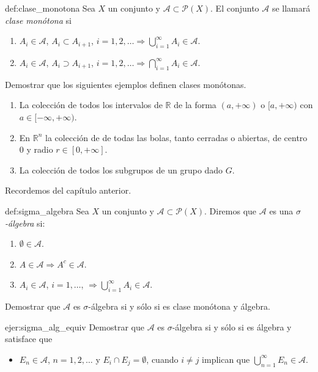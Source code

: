 \begin{definicion}{def:clase_monotona} 
 Sea $X$ un conjunto y $\mathscr{A}\subset\mathcal{P}(X)$. El conjunto $\mathscr{A}$ se llamará   \emph{clase monótona} si
 \begin{enumerate}
  \item $A_i\in\mathscr{A}$, $A_i\subset A_{i+1}$, $i=1,2,\ldots\Rightarrow \bigcup_{i=1}^{\infty}A_i\in\mathscr{A}$. 
    \item $A_i\in\mathscr{A}$, $A_i\supset A_{i+1}$, $i=1,2,\ldots\Rightarrow \bigcap_{i=1}^{\infty}A_i\in\mathscr{A}$. 
 \end{enumerate}

\end{definicion}

\begin{ejercicio}{} Demostrar que los siguientes ejemplos definen clases monótonas.
 \begin{enumerate}
  \item La colección de todos los intervalos de $\mathbb{R}$ de la forma $(a,+\infty)$ o $[a,+\infty)$ con $a\in [-\infty,+\infty)$.
  \item En $\mathbb{R}^n$ la colección de de todas las bolas, tanto cerradas o abiertas, de centro $0$ y radio $r\in[0,+\infty]$. 
  \item La colección de todos los subgrupos de un grupo dado $G$. 
 \end{enumerate}
\end{ejercicio}

Recordemos del capítulo anterior.
\begin{definicion}{def:sigma_algebra} 
 Sea $X$ un conjunto y $\mathscr{A}\subset \mathcal{P}(X)$. Diremos que $\mathscr{A}$ es una \emph{$\sigma$-álgebra} si:
 \begin{enumerate}
  \item $\emptyset\in\mathscr{A}$.
  \item $A\in\mathscr{A}\Rightarrow A^c\in\mathscr{A}$.
  \item $A_i\in\mathscr{A}$, $i=1,\ldots$, $\Rightarrow\bigcup_{i=1}^{\infty}A_i\in\mathscr{A}$.
 \end{enumerate}

\end{definicion}


\begin{ejercicio}{} Demostrar que  $\mathscr{A}$ es $\sigma$-álgebra si y sólo si es clase monótona y álgebra.
 
\end{ejercicio}
\begin{ejercicio}{ejer:sigma_alg_equiv} Demostrar que  $\mathscr{A}$ es $\sigma$-álgebra si y sólo si es álgebra y satisface que 
\begin{itemize}
 \item $E_n\in\mathscr{A}$, $n=1,2,\ldots$ y $E_i\cap E_j=\emptyset$, cuando $i\neq j$ implican que $\bigcup_{n=1}^{\infty} E_n\in\mathscr{A}$.
\end{itemize}

 
\end{ejercicio}


